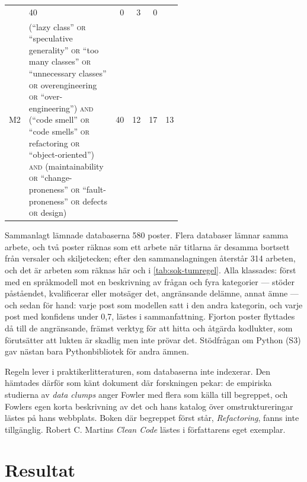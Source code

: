 \begin{table}[!b]
\begin{tabular}{@{}lp{0.58\linewidth}rrrr@{}}
       & 40 & 0 & 3 & 0 \\
    M2 & (\enquote{lazy class} \textsc{or} \enquote{speculative generality} \textsc{or} \enquote{too many classes} \textsc{or} \enquote{unnecessary classes} \textsc{or} overengineering \textsc{or} \enquote{over-engineering}) \textsc{and} (\enquote{code smell} \textsc{or} \enquote{code smells} \textsc{or} refactoring \textsc{or} \enquote{object-oriented}) \textsc{and} (maintainability \textsc{or} \enquote{change-proneness} \textsc{or} \enquote{fault-proneness} \textsc{or} defects \textsc{or} design)
       & 40 & 12 & 17 & 13 \\
    \bottomrule
  \end{tabular}
\end{table}

Sammanlagt lämnade databaserna 580 poster.  Flera databaser lämnar
samma arbete, och två poster räknas som ett arbete när titlarna är
desamma bortsett från versaler och skiljetecken; efter den
sammanslagningen återstår 314 arbeten, och det är arbeten som räknas här
och i \cref{tab:sok-tumregel}.  Alla klassades: först med en språkmodell
mot en beskrivning av frågan och fyra kategorier --- stöder påståendet,
kvalificerar eller motsäger det, angränsande delämne, annat ämne --- och
sedan för hand: varje post som modellen satt i den andra kategorin, och
varje post med konfidens under 0,7, lästes i sammanfattning.  Fjorton
poster flyttades då till de angränsande, främst verktyg för att hitta
och åtgärda kodlukter, som förutsätter att lukten är skadlig men inte
prövar det.  Stödfrågan om Python (S3) gav nästan bara Pythonbibliotek
för andra ämnen.

Regeln lever i praktikerlitteraturen, som databaserna inte indexerar.
Den hämtades därför som känt dokument där forskningen pekar: de
empiriska studierna av \emph{data clumps} anger Fowler med flera som
källa till begreppet\autocite[tabell~I]{Hall2014Smells}, och Fowlers egen
korta beskrivning av det\autocite{Fowler2006DataClump} och hans katalog
över omstruktureringar\autocite{Fowler2018EncapsulateRecord} lästes på
hans webbplats.  Boken där begreppet först står, \emph{Refactoring},
fanns inte tillgänglig.  Robert C. Martins \emph{Clean
Code}\autocite{Martin2008CleanCode} lästes i författarens eget
exemplar.

\section{Resultat}
\label{sec:tum-resultat}

